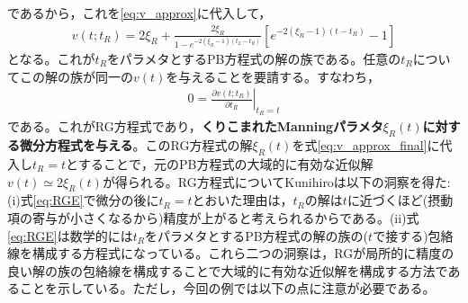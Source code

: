 \documentclass[11pt,a4paper]{ltjsarticle}
\theoremstyle{definition}
\theoremstyle{remark}
\begin{document}
であるから，これを\eqref{eq:v_approx}に代入して，
\begin{align}
  v(t;t_R) = 2\xi_R + \frac{2\xi_R}{1-e^{-2(\xi_R-1)(t_L-t_R)}} \left[ e^{-2(\xi_R-1)(t-t_R)}-1\right] \label{eq:v_approx_final}
\end{align}
となる。これが$t_R$をパラメタとするPB方程式の解の族である。任意の$t_R$についてこの解の族が同一の$v(t)$を与えることを要請する。すなわち，
\begin{align}
  0=\left.\frac{\partial v(t;t_R)}{\partial t_R}\right|_{t_R=t} \label{eq:RGE}
\end{align}
である。これがRG方程式であり，\textbf{くりこまれたManningパラメタ$\xi_R(t)$に対する微分方程式を与える}。このRG方程式の解$\xi_R(t)$を式\eqref{eq:v_approx_final}に代入し$t_R=tとすることで$，元のPB方程式の大域的に有効な近似解$v(t)\simeq 2\xi_R(t)$が得られる。RG方程式についてKunihiroは以下の洞察を得た: (i)式\eqref{eq:RGE}で微分の後に$t_R=t$とおいた理由は，$t_R$の解は$t$に近づくほど(摂動項の寄与が小さくなるから)精度が上がると考えられるからである。(ii)式\eqref{eq:RGE}は数学的には$t_R$をパラメタとするPB方程式の解の族の($t$で接する)包絡線を構成する方程式になっている。これら二つの洞察は，RGが局所的に精度の良い解の族の包絡線を構成することで大域的に有効な近似解を構成する方法であることを示している。ただし，今回の例では以下の点に注意が必要である。
\end{document}
